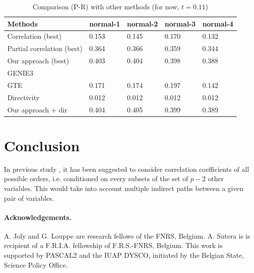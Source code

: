 \documentclass[wcp]{jmlr}
\begin{document}
\begin{table}[htb]
\centering
\caption{Comparison (P-R) with other methods (for now, $t = 0.11$)}
\begin{tabular}{*{5}{l}}
\toprule
Methods             & normal-1 & normal-2 & normal-3 & normal-4 \\
\midrule
Correlation (best)         & 0.153 & 0.145 & 0.170 & 0.132 \\
Partial correlation (best) & 0.364 & 0.366 & 0.359 & 0.344 \\
Our approach (best)        & 0.403 & 0.404 & 0.398 & 0.388 \\
GENIE3                     & & & & \\
GTE                        & 0.171 & 0.174 & 0.197 & 0.142 \\
Directivity                & 0.012 & 0.012 & 0.012 & 0.012 \\
Our approach + dir         & 0.404 & 0.405 & 0.399 & 0.389 \\
\bottomrule
\end{tabular}
\end{table}



\section{Conclusion}

In previous study \cite{shipley2002cause}, it has been suggested to
consider correlation coefficients of all possible orders,
i.e. conditioned on every subsets of the set of $p-2$ other variables. This
would take into account multiple indirect paths between a given pair of
variables.





\begin{scriptsize}

\paragraph{Acknowledgements.} A. Joly and G. Louppe are research fellows of
the FNRS, Belgium.  A. Sutera is  is recipient of
a F.R.I.A. fellowship of F.R.S.-FNRS, Belgium.
This work is supported by PASCAL2 and the IUAP DYSCO, initiated by the
Belgian State, Science Policy Office.

\end{scriptsize}
\end{document}
